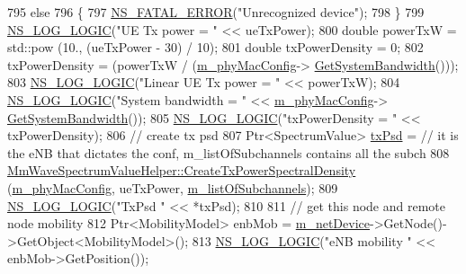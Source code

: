 \begin{DoxyCode}
795                 \textcolor{keywordflow}{else}
796                 \{
797                         \hyperlink{group__fatal_ga5131d5e3f75d7d4cbfd706ac456fdc85}{NS\_FATAL\_ERROR}(\textcolor{stringliteral}{"Unrecognized device"});
798                 \}
799                 \hyperlink{group__logging_ga88acd260151caf2db9c0fc84997f45ce}{NS\_LOG\_LOGIC}(\textcolor{stringliteral}{"UE Tx power = "} << ueTxPower);
800             \textcolor{keywordtype}{double} powerTxW = std::pow (10., (ueTxPower - 30) / 10);
801             \textcolor{keywordtype}{double} txPowerDensity = 0;
802         txPowerDensity = (powerTxW / (\hyperlink{classns3_1_1MmWavePhy_a869abf36bbdbb94eed77ba6e4846f6e4}{m\_phyMacConfig}->
      \hyperlink{classns3_1_1MmWavePhyMacCommon_a8a0b7aa68fc805eb3e8cbdc289fde04c}{GetSystemBandwidth}()));
803             \hyperlink{group__logging_ga88acd260151caf2db9c0fc84997f45ce}{NS\_LOG\_LOGIC}(\textcolor{stringliteral}{"Linear UE Tx power = "} << powerTxW);
804             \hyperlink{group__logging_ga88acd260151caf2db9c0fc84997f45ce}{NS\_LOG\_LOGIC}(\textcolor{stringliteral}{"System bandwidth = "} << \hyperlink{classns3_1_1MmWavePhy_a869abf36bbdbb94eed77ba6e4846f6e4}{m\_phyMacConfig}->
      \hyperlink{classns3_1_1MmWavePhyMacCommon_a8a0b7aa68fc805eb3e8cbdc289fde04c}{GetSystemBandwidth}());
805             \hyperlink{group__logging_ga88acd260151caf2db9c0fc84997f45ce}{NS\_LOG\_LOGIC}(\textcolor{stringliteral}{"txPowerDensity = "} << txPowerDensity);
806                 \textcolor{comment}{// create tx psd}
807                 Ptr<SpectrumValue> \hyperlink{lte__link__budget_8m_a684fe3101a5e48a5fcc57cab8dbcd1aa}{txPsd} =                                         \textcolor{comment}{// it is the eNB
       that dictates the conf, m\_listOfSubchannels contains all the subch}
808                         \hyperlink{classns3_1_1MmWaveSpectrumValueHelper_a1a968ae81d81f346027fe474e7962148}{MmWaveSpectrumValueHelper::CreateTxPowerSpectralDensity}
       (\hyperlink{classns3_1_1MmWavePhy_a869abf36bbdbb94eed77ba6e4846f6e4}{m\_phyMacConfig}, ueTxPower, \hyperlink{classns3_1_1MmWaveEnbPhy_aa13c933468e02fe5f7f10a6a68cea43e}{m\_listOfSubchannels});
809                 \hyperlink{group__logging_ga88acd260151caf2db9c0fc84997f45ce}{NS\_LOG\_LOGIC}(\textcolor{stringliteral}{"TxPsd "} << *txPsd);
810 
811                 \textcolor{comment}{// get this node and remote node mobility}
812                 Ptr<MobilityModel> enbMob = \hyperlink{classns3_1_1MmWavePhy_a0f14f4e8f7539b06497ba321d9df344c}{m\_netDevice}->GetNode()->GetObject<MobilityModel>(); 
813                 \hyperlink{group__logging_ga88acd260151caf2db9c0fc84997f45ce}{NS\_LOG\_LOGIC}(\textcolor{stringliteral}{"eNB mobility "} << enbMob->GetPosition());

\end{DoxyCode}
